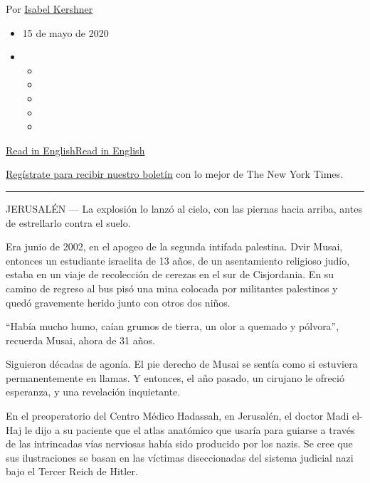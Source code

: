 Por \href{https://www.nytimes3xbfgragh.onion/by/isabel-kershner}{Isabel
Kershner}

\begin{itemize}
\item
  15 de mayo de 2020
\item
  \begin{itemize}
  \item
  \item
  \item
  \item
  \item
  \end{itemize}
\end{itemize}

\href{https://www.nytimes3xbfgragh.onion/2020/05/12/world/middleeast/nazi-medical-text-israel.html}{Read
in
English}\href{https://www.nytimes3xbfgragh.onion/2020/05/12/world/middleeast/nazi-medical-text-israel.html}{Read
in English}

\href{https://www.nytimes3xbfgragh.onion/newsletters/el-times}{Regístrate
para recibir nuestro boletín} con lo mejor de The New York Times.

\begin{center}\rule{0.5\linewidth}{\linethickness}\end{center}

JERUSALÉN --- La explosión lo lanzó al cielo, con las piernas hacia
arriba, antes de estrellarlo contra el suelo.

Era junio de 2002, en el apogeo de la segunda intifada palestina. Dvir
Musai, entonces un estudiante israelita de 13 años, de un asentamiento
religioso judío, estaba en un viaje de recolección de cerezas en el sur
de Cisjordania. En su camino de regreso al bus pisó una mina colocada
por militantes palestinos y quedó gravemente herido junto con otros dos
niños.

``Había mucho humo, caían grumos de tierra, un olor a quemado y
pólvora'', recuerda Musai, ahora de 31 años.

Siguieron décadas de agonía. El pie derecho de Musai se sentía como si
estuviera permanentemente en llamas. Y entonces, el año pasado, un
cirujano le ofreció esperanza, y una revelación inquietante.

En el preoperatorio del Centro Médico Hadassah, en Jerusalén, el doctor
Madi el-Haj le dijo a su paciente que el atlas anatómico que usaría para
guiarse a través de las intrincadas vías nerviosas había sido producido
por los nazis. Se cree que sus ilustraciones se basan en las víctimas
diseccionadas del sistema judicial nazi bajo el Tercer Reich de Hitler.

